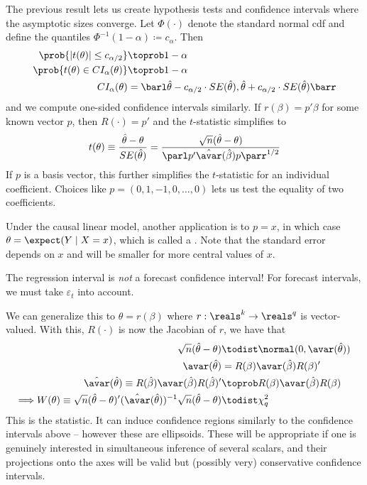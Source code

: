 \documentclass[10pt]{article}
\begin{document}
The previous result lets us create hypothesis tests and confidence intervals where the asymptotic sizes converge. Let $\Phi(\cdot)$ denote the standard normal cdf and define the quantiles $\Phi^{-1}(1-\alpha) \coloneqq c_\alpha$. Then
\begin{align*}
	\prob\{|t(\theta)| \le c_{\alpha / 2}\}&\toprob 1-\alpha \\
	\prob\{t(\theta) \in CI_\alpha(\theta)\} &\toprob 1-\alpha \\
	CI_\alpha(\theta) &= \barl \hat{\theta} - c_{\alpha / 2}\cdot SE(\hat{\theta}), \hat{\theta} + c_{\alpha / 2}\cdot SE(\hat{\theta})\barr
\end{align*}
and we compute one-sided confidence intervals similarly. If $r(\beta) = p'\beta$ for some known vector $p$, then $R(\cdot) = p'$ and the $t$-statistic simplifies to \[t(\theta) \equiv \frac{\hat{\theta}-\theta}{SE(\hat{\theta})} = \frac{\sqrt{n}(\hat{\theta}-\theta)}{\parl p' \hat{\avar}(\hat{\beta}) p\parr^{1/2}}\]If $p$ is a basis vector, this further simplifies the $t$-statistic for an individual coefficient. Choices like $p = (0,1,-1,0,\dots,0)$ lets us test the equality of two coefficients.

Under the causal linear model, another application is to $p = x$, in which case $\theta = \expect(Y \mid X = x)$, which is called a . Note that the standard error depends on $x$ and will be smaller for more central values of $x$. 

\begin{remark}
	The regression interval is \emph{not} a forecast confidence interval! For forecast intervals, we must take $\varepsilon_t$ into account.
\end{remark}


We can generalize this to $\theta = r(\beta)$ where $r: \reals^k \to \reals^q$ is vector-valued. With this, $R(\cdot)$ is now the Jacobian of $r$, we have that 
\begin{align*}
	\sqrt{n}(\hat{\theta} - \theta) &\todist \normal(0,\avar(\hat{\theta})) \\
	\avar(\hat{\theta}) &= R(\beta) \avar(\hat{\beta})R(\beta)' \\
	\hat{\avar}(\hat{\theta}) \equiv  R(\hat{\beta}) \avar(\hat{\beta})R(\hat{\beta})' &\toprob R(\beta) \avar(\hat{\beta})R(\beta) \\ 
	\Longrightarrow W(\theta) \equiv \sqrt{n}(\hat{\theta}-\theta)' (\hat{\avar}(\hat{\theta}))^{-1} \sqrt{n}(\hat{\theta}-\theta) &\todist \chi_q^2
\end{align*}
This is the  statistic. It can induce confidence regions similarly to the confidence intervals above -- however these are ellipsoids. These will be appropriate if one is genuinely interested in simultaneous inference of several scalars, and their projections onto the axes will be valid but (possibly very) conservative confidence intervals.
\end{document}
